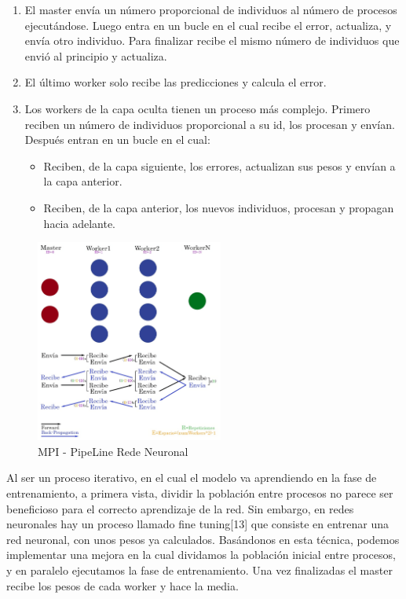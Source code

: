 	\begin{enumerate}
		\item El master envía un número proporcional de individuos al número de procesos ejecutándose. Luego entra en un bucle en el cual recibe el error, actualiza, y envía otro individuo. Para finalizar recibe el mismo número de individuos que envió al principio y actualiza.
		\item El último worker solo recibe las predicciones y calcula el error.
		\item Los workers de la capa oculta tienen un proceso más complejo. Primero reciben un número de individuos proporcional a su id, los procesan y envían. Después entran en un bucle en el cual:			
		\begin{itemize}
			\item Reciben, de la capa siguiente, los errores, actualizan sus pesos y envían a la capa anterior.			
			\item Reciben, de la capa anterior, los nuevos individuos, procesan y propagan hacia adelante.
		\end{itemize}		
		
	\end{enumerate}
	
	\begin{figure}[!h]
		\centering
		\includegraphics[width=0.55\textwidth]{images/chapter_3/redneu_mpi2}
		\caption{MPI - PipeLine Rede Neuronal}
		\label{fig:redneumpipipe}
	\end{figure}
	
	Al ser un proceso iterativo, en el cual el modelo va aprendiendo en la fase de entrenamiento, a primera vista, dividir la población entre procesos no parece ser beneficioso para el correcto aprendizaje de la red. Sin embargo, en redes neuronales hay un proceso llamado fine tuning[13] que consiste en entrenar una red neuronal, con unos pesos ya calculados. Basándonos en esta técnica, podemos implementar una mejora en la cual dividamos la población inicial entre procesos, y en paralelo ejecutamos la fase de entrenamiento. Una vez finalizadas el master recibe los pesos de cada worker y hace la media. 
	
